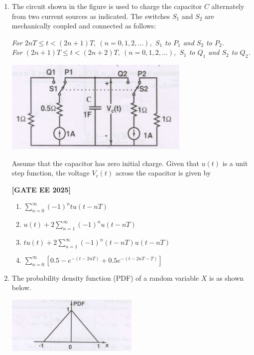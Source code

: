\documentclass[12pt]{article}
\begin{document}
\begin{enumerate}[leftmargin=*, label=\textbf{Q.\arabic*:}]
\item The circuit shown in the figure is used to charge the capacitor $C$ alternately from two current sources as indicated. The switches $S_1$ and $S_2$ are mechanically coupled and connected as follows:

\textit{For $2nT \leq t < (2n+1)T,\ (n=0,1,2,\ldots)$,\ $S_1$ to $P_1$ and $S_2$ to $P_2$.}\\
\textit{For $(2n+1)T \leq t < (2n+2)T,\ (n=0,1,2,\ldots)$,\ $S_1$ to $Q_1$ and $S_2$ to $Q_2$.}
\begin{center}
\includegraphics[width=0.7\textwidth]{figs/q23.png}
\end{center}
Assume that the capacitor has zero initial charge. Given that $u(t)$ is a unit step function, the voltage $V_c(t)$ across the capacitor is given by
 
\noindent \textbf{[GATE EE 2025]}
\begin{enumerate}[label=(\Alph*)]
  \item $\displaystyle\sum_{n=0}^\infty (-1)^n t u(t-nT)$
  \item $\displaystyle u(t) + 2 \sum_{n=1}^\infty (-1)^n u(t-nT)$
  \item $\displaystyle t u(t) + 2 \sum_{n=1}^\infty (-1)^n (t-nT)u(t-nT)$
  \item $\displaystyle \sum_{n=0}^\infty \left[ 0.5 - e^{-(t-2nT)} + 0.5e^{-(t-2nT-T)} \right]$
\end{enumerate}

\newpage

\item
The probability density function (PDF) of a random variable $X$ is as shown below.

\begin{center}
\includegraphics[width=0.5\textwidth]{figs/q24a.png}
\end{center}


\end{enumerate}
\end{document}

